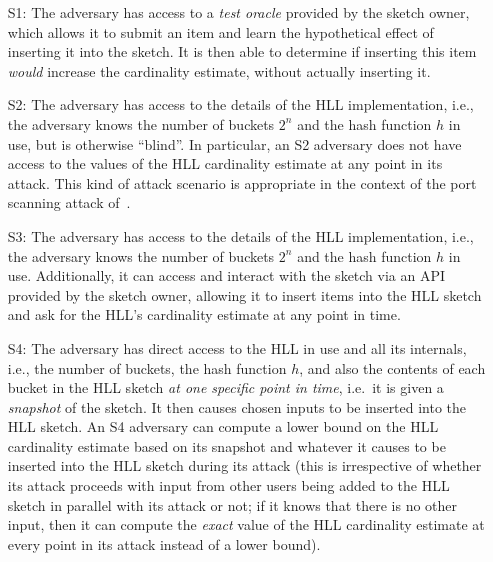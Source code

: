 \documentclass{IEEEtran}
\newcommand{\kenny}[1]{\todo[inline]{\textbf{Kenny:} #1}\xspace}
\begin{document}
\begin{itemize}
\item[S1:] The adversary has access to a \textit{test oracle} provided by the sketch owner, which allows it to submit an item and learn the hypothetical effect of inserting it into the sketch. It is then able to determine if inserting this item \textit{would} increase the cardinality estimate, without actually inserting it.
\item[S2:] The adversary has access to the details of the HLL implementation, i.e., the adversary knows the number of buckets $2^n$ and the hash function $h$ in use, but is otherwise ``blind''. In particular, an S2 adversary does not have access to the values of the HLL cardinality estimate at any point in its attack. This kind of attack scenario is appropriate in the context of the port scanning attack of~\cite{portscanhll}.
\item[S3:] The adversary has access to the details of the HLL implementation, i.e., the adversary knows the number of buckets $2^n$ and the hash function $h$ in use. Additionally, it can access and interact with the sketch via an API provided by the sketch owner, allowing it to insert items into the HLL sketch and ask for the HLL's cardinality estimate at any point in time.
\item[S4:] The adversary has direct access to the HLL in use and all its internals, i.e., the number of buckets, the hash function $h$, and also the contents of each bucket in the HLL sketch \emph{at one specific point in time}, i.e.\ it is given a \emph{snapshot} of the sketch. It then causes chosen inputs to be inserted into the HLL sketch. An S4 adversary can compute a lower bound on the HLL cardinality estimate based on its snapshot and whatever it causes to be inserted into the HLL sketch during its attack (this is irrespective of whether its attack proceeds with input from other users being added to the HLL sketch in parallel with its attack or not; if it knows that there is no other input, then it can compute the \emph{exact} value of the HLL cardinality estimate at every point in its attack instead of a lower bound).
\end{itemize}
\end{document}
